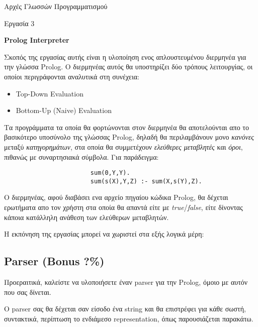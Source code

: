 \documentclass[10pt]{article}
\begin{document}
\begin{center}
    \huge{Αρχές Γλωσσών Προγραμματισμού}

    \LARGE{Εργασία 3}

    \textbf{\Large{Prolog Interpreter}}
\end{center}

\vspace{0.5cm}

Σκοπός της εργασίας αυτής είναι η υλοποίηση ενος απλουστευμένου διερμηνέα για την γλώσσα Prolog. Ο διερμηνέας αυτός θα υποστηρίζει δύο τρόπους λειτουργίας, οι οποίοι περιγράφονται αναλυτικά στη συνέχεια:


\begin{itemize}
    \item Top-Down Evaluation
    \item Bottom-Up (Naive) Evaluation
\end{itemize}


Τα προγράμματα τα οποία θα φορτώνονται στον διερμηνέα θα αποτελούνται απο το βασικότερο υποσύνολο της γλώσσας Prolog, δηλαδή θα περιλαμβάνουν μονο \textit{κανόνες} μεταξύ \textit{κατηγορημάτων}, στα οποία θα συμμετέχουν \textit{ελεύθερες μεταβλητές} και \textit{όροι}, πιθανώς με συναρτησιακά σύμβολα. Για παράδειγμα: 



\begin{verbatim}
                        sum(0,Y,Y).
                        sum(s(X),Y,Z) :- sum(X,s(Y),Z).
\end{verbatim}



Ο διερμηνέας, αφού διαβάσει ενα αρχείο πηγαίου κώδικα Prolog, θα δέχεται ερωτήματα απο τον χρήστη στα οποία θα απαντά είτε με \textit{true}/\textit{false}, είτε δίνοντας κάποια κατάλληλη ανάθεση των ελεύθερων μεταβλητών.\

Η εκπόνηση της εργασίας μπορεί να χωριστεί στα εξής λογικά μέρη:

\subsection*{Parser (Bonus ?\%)}

Προεραιτικά, καλείστε να υλοποιήσετε έναν parser για την Prolog, όμοιο με αυτόν που σας δίνεται.\

Ο parser σας θα δέχεται σαν είσοδο ένα string και θα επιστρέφει για κάθε σωστή, συντακτικά, περίπτωση το ενδιάμεσο representation, όπως παρουσιάζεται παρακάτω.\
\end{document}
